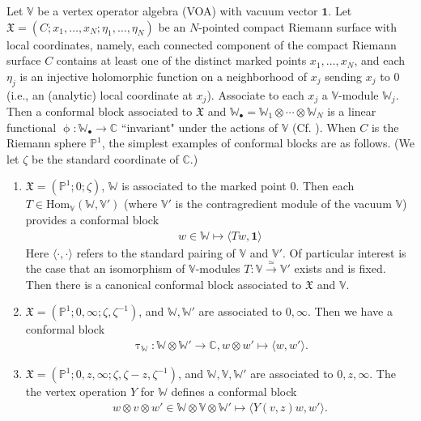 \documentclass[12pt,a4paper,notitlepage]{article}
\theoremstyle{definition}
\theoremstyle{plain}
\newcommand{\fk}{\mathfrak}
\newcommand{\id}{\mathbf{1}}
\newcommand{\Hom}{\mathrm{Hom}}
\newcommand{\bk}[1]{\langle {#1}\rangle}
\newcommand{\blt}{\bullet}
\newcommand{\Vbb}{\mathbb V}
\newcommand{\Wbb}{\mathbb W}
\newcommand{\Cbb}{\mathbb C}
\newcommand{\Pbb}{\mathbb P}
\numberwithin{equation}{section}
\begin{document}
Let $\Vbb$ be a vertex operator algebra (VOA) with vacuum vector $\id$. Let $\fk X=(C;x_1,\dots,x_N;\eta_1,\dots,\eta_N)$ be an $N$-pointed compact Riemann surface with local coordinates, namely, each connected component of the compact Riemann surface $C$ contains at least one of the distinct marked points $x_1,\dots,x_N$, and each $\eta_j$ is an injective holomorphic function on a neighborhood of $x_j$ sending $x_j$ to $0$ (i.e., an (analytic) local coordinate at $x_j$). Associate to each $x_j$ a $\Vbb$-module $\Wbb_j$. Then a conformal block  associated to $\fk X$ and $\Wbb_\blt=\Wbb_1\otimes\cdots\otimes\Wbb_N$ is a linear functional $\upphi:\Wbb_\blt\rightarrow\Cbb$ ``invariant" under the actions of $\Vbb$ (Cf. \cite{Zhu94,FB04,DGT19a}). When $C$ is the Riemann sphere $\Pbb^1$, the simplest examples of conformal blocks are as follows. (We let $\zeta$ be the standard coordinate of $\Cbb$.)

\begin{enumerate}
\item $\fk X=(\Pbb^1;0;\zeta)$, $\Wbb$ is associated to the marked point $0$. Then each $T\in\Hom_\Vbb(\Wbb,\Vbb')$ (where $\Vbb'$ is the contragredient module of the vacuum $\Vbb$) provides a conformal block
\begin{align*}
w\in\Wbb\mapsto \bk{Tw,\id}	
\end{align*}
Here $\bk{\cdot,\cdot}$ refers to the standard pairing of $\Vbb$ and $\Vbb'$. Of particular interest is the case that an isomorphism of $\Vbb$-modules $T:\Vbb\xrightarrow{\simeq}\Vbb'$ exists and is fixed. Then there is a canonical conformal block associated to $\fk X$ and $\Vbb$.
\item $\fk X=(\Pbb^1;0,\infty;\zeta,\zeta^{-1})$, and $\Wbb,\Wbb'$ are associated to $0,\infty$. Then  we have a conformal block
\begin{align}
\uptau_\Wbb:\Wbb\otimes\Wbb'\rightarrow\Cbb,w\otimes w'\mapsto \bk{w,w'}.	\label{eq58}
\end{align}
\item $\fk X=(\Pbb^1;0,z,\infty;\zeta,\zeta-z,\zeta^{-1})$, and $\Wbb,\Vbb,\Wbb'$ are associated to $0,z,\infty$. The the vertex operation $Y$ for $\Wbb$ defines a conformal block
\begin{align}
w\otimes v\otimes w'\in\Wbb\otimes\Vbb\otimes\Wbb'\mapsto \bk{Y(v,z)w,w'}.\label{eq55}
\end{align}
\end{enumerate}
\end{document}
